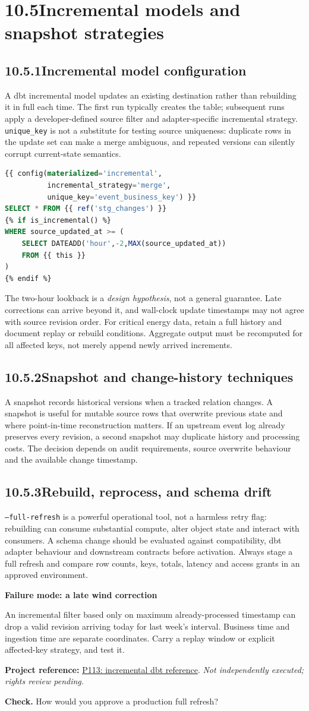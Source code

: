 \documentclass[11pt,twoside]{article}
\newcommand{\topic}[2]{\subsection*{#1\quad #2}}
\newcommand{\repo}[2]{\par\begingroup\fontsize{8.0}{9.6}\selectfont\sffamily\color{inkgray}\textbf{Project reference:} \href{#2}{#1}. \textit{Not independently executed; rights review pending.}\par\endgroup}
\begin{document}
\section*{10.5\quad Incremental models and snapshot strategies}
\topic{10.5.1}{Incremental model configuration}
A dbt incremental model updates an existing destination rather than rebuilding it in full each time. The first run typically creates the table; subsequent runs apply a developer-defined source filter and adapter-specific incremental strategy. \texttt{unique\_key} is not a substitute for testing source uniqueness: duplicate rows in the update set can make a merge ambiguous, and repeated versions can silently corrupt current-state semantics.
\begin{lstlisting}[language=SQL,caption={Minimal incremental pattern; adapt to validated change-feed data.}]
{{ config(materialized='incremental',
          incremental_strategy='merge',
          unique_key='event_business_key') }}
SELECT * FROM {{ ref('stg_changes') }}
{% if is_incremental() %}
WHERE source_updated_at >= (
    SELECT DATEADD('hour',-2,MAX(source_updated_at))
    FROM {{ this }}
)
{% endif %}
\end{lstlisting}
The two-hour lookback is a \emph{design hypothesis}, not a general guarantee. Late corrections can arrive beyond it, and wall-clock update timestamps may not agree with source revision order. For critical energy data, retain a full history and document replay or rebuild conditions. Aggregate output must be recomputed for all affected keys, not merely append newly arrived increments.
\topic{10.5.2}{Snapshot and change-history techniques}
A snapshot records historical versions when a tracked relation changes. A snapshot is useful for mutable source rows that overwrite previous state and where point-in-time reconstruction matters. If an upstream event log already preserves every revision, a second snapshot may duplicate history and processing costs. The decision depends on audit requirements, source overwrite behaviour and the available change timestamp.
\topic{10.5.3}{Rebuild, reprocess, and schema drift}
\texttt{--full-refresh} is a powerful operational tool, not a harmless retry flag: rebuilding can consume substantial compute, alter object state and interact with consumers. A schema change should be evaluated against compatibility, dbt adapter behaviour and downstream contracts before activation. Always stage a full refresh and compare row counts, keys, totals, latency and access grants in an approved environment.
\begin{insight}\textbf{Failure mode: a late wind correction}\par
An incremental filter based only on maximum already-processed timestamp can drop a valid revision arriving today for last week's interval. Business time and ingestion time are separate coordinates. Carry a replay window or explicit affected-key strategy, and test it.\end{insight}
\repo{P113: incremental dbt reference}{https://github.com/arnoN7/dbt-incremental-stream}
\textbf{Check.} How would you approve a production full refresh?
\newpage
\end{document}
